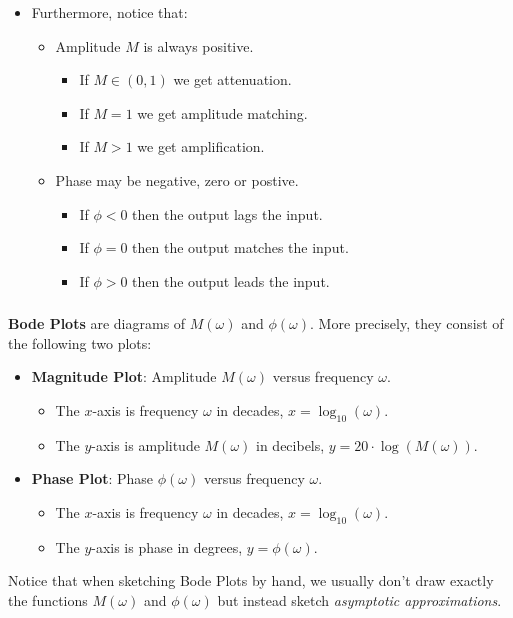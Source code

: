 \documentclass[ 10pt, xcolor = dvipsnames]{beamer}
\begin{document}
\begin{frame}[allowframebreaks]
\begin{itemize}
\item Furthermore, notice that: 
\begin{itemize}
\item Amplitude $M$ is always positive. 
\begin{itemize}
\item If $M \in (0,1)$ we get attenuation. 
\item If $M = 1$ we get amplitude matching. 
\item If $M > 1$ we get amplification. 
\end{itemize}
\item Phase may be negative, zero or postive. 
\begin{itemize}
\item If $\phi < 0$ then the output lags the input. 
\item If $\phi = 0$ then the output matches the input. 
\item If $\phi > 0$ then the output leads the input. 
\end{itemize}
\end{itemize}
\end{itemize}

\end{frame}

\begin{frame}[allowframebreaks]
\frametitle{\insertsection}

\textbf{Bode Plots} are diagrams of $M(\omega)$ and $\phi(\omega)$. More precisely, they consist of \linebreak the following two plots: 
\begin{itemize}
\item \textbf{Magnitude Plot}: Amplitude $M(\omega)$ versus frequency $\omega$. 
\begin{itemize}
\item The $x$-axis is frequency $\omega$ in decades, \ie $x = \log_{10}(\omega)$. 
\item The $y$-axis is amplitude $M(\omega)$ in decibels, \ie $y = 20 \cdot \log(M(\omega))$. 
\end{itemize}
\item \textbf{Phase Plot}: Phase $\phi(\omega)$ versus frequency $\omega$. 
\begin{itemize}
\item The $x$-axis is frequency $\omega$ in decades, \ie $x = \log_{10}(\omega)$. 
\item The $y$-axis is phase in degrees, \ie $y = \phi(\omega)$. 
\end{itemize}
\end{itemize}
\halfskip

Notice that when sketching Bode Plots by hand, we usually don't draw exactly \linebreak the functions $M(\omega)$ and $\phi(\omega)$ but instead sketch \emph{asymptotic approximations}. 

\end{frame}
\end{document}
